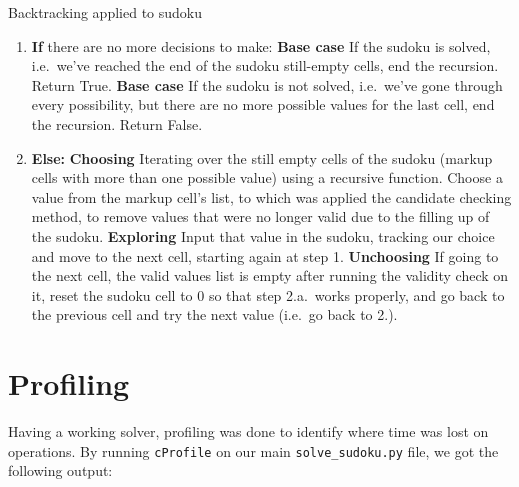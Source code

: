 \documentclass[12pt]{report} %
\begin{document}
\begin{examplebox}{Backtracking applied to sudoku}

    \begin{enumerate}
      \item \textbf{If} there are no more decisions to make:
      \textbf{Base case} If the sudoku is solved, i.e.\ we've reached the end of the sudoku still-empty cells, end the recursion. Return True.
       \textbf{Base case} If the sudoku is not solved, i.e.\ we've gone through every possibility, but there are no more possible values for the last cell, end the recursion. Return False.
      \item \textbf{Else:}
       \textbf{Choosing} Iterating over the still empty cells of the sudoku (markup cells with more than one possible value) using a recursive function. Choose a value from the markup cell's list, to which was applied the candidate checking method, to remove values that were no longer valid due to the filling up of the sudoku.
       \textbf{Exploring} Input that value in the sudoku, tracking our choice and move to the next cell, starting again at step 1.
       \textbf{Unchoosing} If going to the next cell, the valid values list is empty after running the validity check on it, reset the sudoku cell to 0 so that step 2.a.\ works properly, and go back to the previous cell and try the next value (i.e.\ go back to 2.).

    \end{enumerate}

\end{examplebox}



\section{Profiling}



Having a working solver, profiling was done to identify where time was lost on operations. By running \texttt{cProfile} on our main \texttt{solve\_sudoku.py} file, we got the following output:
\end{document}
